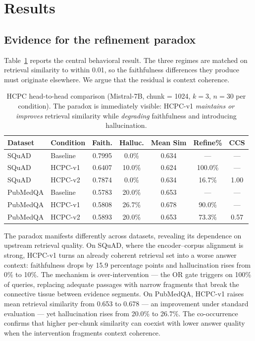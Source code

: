 \section{Results}
\label{sec:results}

\subsection{Evidence for the refinement paradox}

Table~\ref{tab:hcpc_main} reports the central behavioral result. The
three regimes are matched on retrieval similarity to within 0.01, so the
faithfulness differences they produce must originate elsewhere. We argue
that the residual is context coherence.

\begin{table}[!htb]
\centering
\caption{HCPC head-to-head comparison (Mistral-7B, chunk = 1024, $k = 3$,
$n = 30$ per condition). The paradox is immediately visible: HCPC-v1
\emph{maintains or improves} retrieval similarity while \emph{degrading}
faithfulness and introducing hallucination.}
\label{tab:hcpc_main}
\small
\begin{tabular}{llccccc}
\toprule
Dataset & Condition & Faith. & Halluc. & Mean Sim & Refine\% & CCS \\
\midrule
SQuAD    & Baseline & 0.7995 & 0.0\%  & 0.634 & ---    & --- \\
SQuAD    & HCPC-v1  & 0.6407 & 10.0\% & 0.624 & 100.0\% & --- \\
SQuAD    & HCPC-v2  & 0.7874 & 0.0\%  & 0.634 & 16.7\% & 1.00 \\
\midrule
PubMedQA & Baseline & 0.5783 & 20.0\% & 0.653 & ---    & --- \\
PubMedQA & HCPC-v1  & 0.5808 & 26.7\% & 0.678 & 90.0\% & --- \\
PubMedQA & HCPC-v2  & 0.5893 & 20.0\% & 0.653 & 73.3\% & 0.57 \\
\bottomrule
\end{tabular}
\end{table}

The paradox manifests differently across datasets, revealing its
dependence on upstream retrieval quality. On SQuAD, where the
encoder--corpus alignment is strong, HCPC-v1 turns an already coherent
retrieval set into a worse answer context: faithfulness drops by 15.9
percentage points and hallucination rises from 0\% to 10\%. The
mechanism is over-intervention — the OR gate triggers on 100\% of
queries, replacing adequate passages with narrow fragments that break
the connective tissue between evidence segments. On PubMedQA, HCPC-v1
raises mean retrieval similarity from 0.653 to 0.678 — an improvement
under standard evaluation — yet hallucination rises from 20.0\% to
26.7\%. The co-occurrence confirms that higher per-chunk similarity can
coexist with lower answer quality when the intervention fragments
context coherence.

